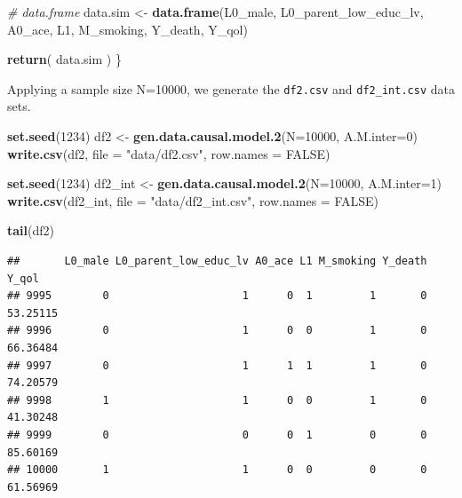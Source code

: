 \documentclass[
]{book}
\newenvironment{Shaded}{\begin{snugshade}}{\end{snugshade}}
\newcommand{\AttributeTok}[1]{\textcolor[rgb]{0.13,0.29,0.53}{#1}}
\newcommand{\CommentTok}[1]{\textcolor[rgb]{0.56,0.35,0.01}{\textit{#1}}}
\newcommand{\ConstantTok}[1]{\textcolor[rgb]{0.56,0.35,0.01}{#1}}
\newcommand{\DecValTok}[1]{\textcolor[rgb]{0.00,0.00,0.81}{#1}}
\newcommand{\FunctionTok}[1]{\textcolor[rgb]{0.13,0.29,0.53}{\textbf{#1}}}
\newcommand{\NormalTok}[1]{#1}
\newcommand{\OtherTok}[1]{\textcolor[rgb]{0.56,0.35,0.01}{#1}}
\newcommand{\StringTok}[1]{\textcolor[rgb]{0.31,0.60,0.02}{#1}}
\begin{document}
\begin{Shaded}
\begin{Highlighting}[]
  \CommentTok{\# data.frame}
\NormalTok{  data.sim }\OtherTok{\textless{}{-}} \FunctionTok{data.frame}\NormalTok{(L0\_male, L0\_parent\_low\_educ\_lv, A0\_ace, L1, M\_smoking, }
\NormalTok{                         Y\_death, Y\_qol)}

  \FunctionTok{return}\NormalTok{( data.sim )}
\NormalTok{\}}
\end{Highlighting}
\end{Shaded}

Applying a sample size N=10000, we generate the \texttt{df2.csv} and \texttt{df2\_int.csv} data sets.

\begin{Shaded}
\begin{Highlighting}[]
\FunctionTok{set.seed}\NormalTok{(}\DecValTok{1234}\NormalTok{)}
\NormalTok{df2 }\OtherTok{\textless{}{-}} \FunctionTok{gen.data.causal.model.2}\NormalTok{(}\AttributeTok{N=}\DecValTok{10000}\NormalTok{, }\AttributeTok{A.M.inter=}\DecValTok{0}\NormalTok{)}
\FunctionTok{write.csv}\NormalTok{(df2, }\AttributeTok{file =} \StringTok{"data/df2.csv"}\NormalTok{, }\AttributeTok{row.names =} \ConstantTok{FALSE}\NormalTok{)}

\FunctionTok{set.seed}\NormalTok{(}\DecValTok{1234}\NormalTok{)}
\NormalTok{df2\_int }\OtherTok{\textless{}{-}} \FunctionTok{gen.data.causal.model.2}\NormalTok{(}\AttributeTok{N=}\DecValTok{10000}\NormalTok{, }\AttributeTok{A.M.inter=}\DecValTok{1}\NormalTok{)}
\FunctionTok{write.csv}\NormalTok{(df2\_int, }\AttributeTok{file =} \StringTok{"data/df2\_int.csv"}\NormalTok{, }\AttributeTok{row.names =} \ConstantTok{FALSE}\NormalTok{)}
\end{Highlighting}
\end{Shaded}

\begin{Shaded}
\begin{Highlighting}[]
\FunctionTok{tail}\NormalTok{(df2)}
\end{Highlighting}
\end{Shaded}

\begin{verbatim}
##       L0_male L0_parent_low_educ_lv A0_ace L1 M_smoking Y_death    Y_qol
## 9995        0                     1      0  1         1       0 53.25115
## 9996        0                     1      0  0         1       0 66.36484
## 9997        0                     1      1  1         1       0 74.20579
## 9998        1                     1      0  0         1       0 41.30248
## 9999        0                     0      0  1         0       0 85.60169
## 10000       1                     1      0  0         0       0 61.56969
\end{verbatim}
\end{document}
